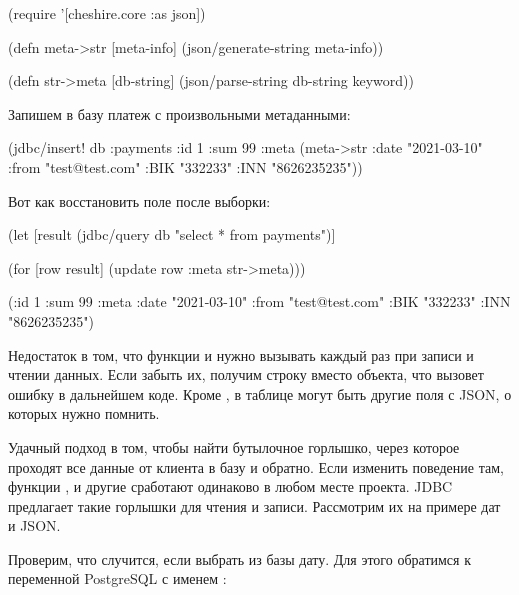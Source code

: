 \begin{english}
  \begin{clojure}
(require '[cheshire.core :as json])

(defn meta->str
  [meta-info]
  (json/generate-string meta-info))

(defn str->meta
  [db-string]
  (json/parse-string db-string keyword))
  \end{clojure}
\end{english}

Запишем в базу платеж с произвольными метаданными:

\begin{english}
  \begin{clojure}
(jdbc/insert!
 db
 :payments
 {:id 1
  :sum 99
  :meta (meta->str
          {:date "2021-03-10"
           :from "test@test.com"
           :BIK "332233"
           :INN "8626235235"})})
  \end{clojure}
\end{english}

Вот как восстановить поле  после выборки:

\begin{english}
  \begin{clojure}
(let [result
      (jdbc/query db "select * from payments")]

  (for [row result]
    (update row :meta str->meta)))

({:id 1
  :sum 99
  :meta {:date "2021-03-10"
         :from "test@test.com"
         :BIK "332233"
         :INN "8626235235"}})
  \end{clojure}
\end{english}

Недостаток в том, что функции  и  нужно вызывать каждый раз при записи и чтении данных. Если забыть их, получим строку вместо объекта, что вызовет ошибку в дальнейшем коде. Кроме , в таблице могут быть другие поля с JSON, о которых нужно помнить.

Удачный подход в том, чтобы найти бутылочное горлышко, через которое проходят все данные от клиента в базу и обратно. Если изменить поведение там, функции ,  и другие сработают одинаково в любом месте проекта. JDBC предлагает такие горлышки для чтения и записи. Рассмотрим их на примере дат и JSON.


Проверим, что случится, если выбрать из базы дату. Для этого обратимся к переменной PostgreSQL с именем :

